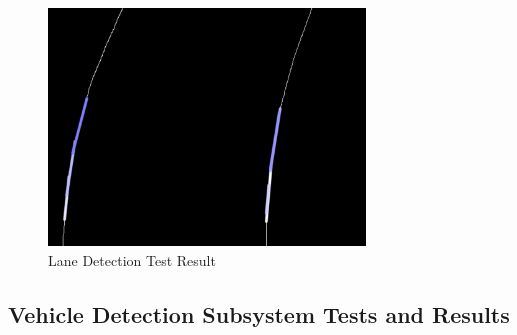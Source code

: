 \documentclass[a4paper,12pt]{article}
\begin{document}
	\begin{figure}[h]
		\includegraphics[width=0.75\textwidth,center]{images/laneD_test}
		\caption{Lane Detection Test Result \label{fig:laneD_test} }
	\end{figure}






\subsection {Vehicle Detection Subsystem Tests and Results}\label{sect:vhd}
\end{document}
